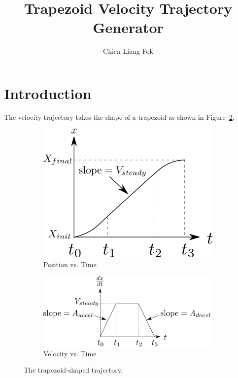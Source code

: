 \documentclass[11pt]{article} %
\title{Trapezoid Velocity Trajectory Generator}
\author{Chien-Liang Fok}
\begin{document}
\maketitle

\section{Introduction}

The velocity trajectory takes the shape of a trapezoid as shown in Figure~\ref{fig:velocity_vs_time}.

\begin{figure}[tbh]
    \centering
    \begin{subfigure}[b]{0.35\textwidth}
        \centering
        \includegraphics[width=\textwidth]{position_vs_time.png}
        \caption{Position vs. Time}
        \label{fig:position_vs_time}
    \end{subfigure}
    \hfill
    \begin{subfigure}[b]{0.575\textwidth}
        \centering
        \includegraphics[width=\textwidth]{velocity_vs_time.png}
        \caption{Velocity vs. Time}
        \label{fig:velocity_vs_time}
    \end{subfigure}
    \caption{The trapezoid-shaped trajectory.}
    \label{fig:trapezoid_trajectory}
\end{figure}
\end{document}
